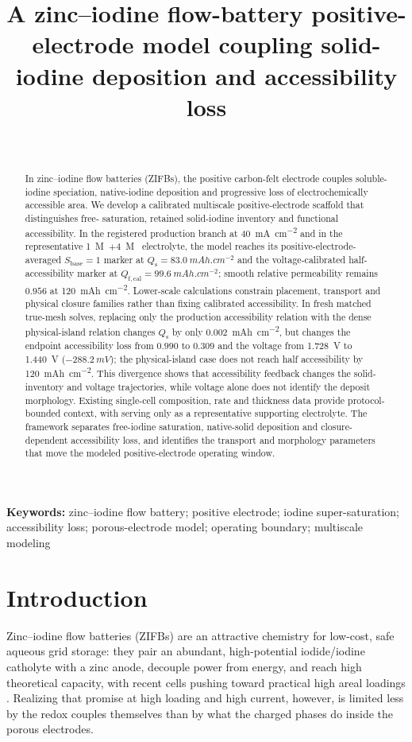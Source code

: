 \documentclass[11pt]{article}
\title{\bfseries A zinc--iodine flow-battery positive-electrode model coupling
solid-iodine deposition and accessibility loss}
\author{~}
\date{}
\newcommand{\Qfcal}{Q_{\mathrm{f,cal}}}
\begin{document}
\maketitle

\begin{abstract}
\noindent
In zinc--iodine flow batteries (ZIFBs), the positive carbon-felt electrode couples soluble-iodine
speciation, native-iodine deposition and progressive loss of electrochemically accessible area. We develop
a calibrated multiscale positive-electrode scaffold that distinguishes free- saturation, retained
solid-iodine inventory and functional accessibility. In the registered production branch at
\SI{40}{mA.cm^{-2}} and in the representative \SI{1}{M}~$+$\SI{4}{M}~
electrolyte, the model reaches its positive-electrode-averaged $S_{\mathrm{base}}=1$ marker at
$Q_{\mathrm s}=\SI{83.0}{mAh.cm^{-2}}$ and the voltage-calibrated half-accessibility marker at
$\Qfcal=\SI{99.6}{mAh.cm^{-2}}$; smooth relative permeability remains $0.956$ at
\SI{120}{mAh.cm^{-2}}. Lower-scale calculations constrain placement, transport and physical closure families
rather than fixing calibrated accessibility. In fresh matched
true-mesh solves, replacing only the production accessibility relation with the dense physical-island relation
changes $Q_{\mathrm s}$ by only \SI{0.002}{mAh.cm^{-2}}, but changes the endpoint accessibility loss from
$0.990$ to $0.309$ and the voltage from \SI{1.728}{V} to \SI{1.440}{V} ($-\SI{288.2}{mV}$); the
physical-island case does not
reach half accessibility by \SI{120}{mAh.cm^{-2}}. This divergence shows that accessibility feedback changes
the solid-inventory and voltage trajectories, while voltage alone does not identify the deposit morphology.
Existing single-cell composition, rate and thickness data provide protocol-bounded context, with 
serving only as a representative supporting electrolyte. The framework separates free-iodine saturation,
native-solid deposition and closure-dependent accessibility loss, and identifies the transport and morphology
parameters that move the modeled positive-electrode operating window.
\end{abstract}

\vspace{0.5em}\noindent\textbf{Keywords:} zinc--iodine flow battery; positive electrode; iodine
super-saturation; accessibility loss; porous-electrode model; operating boundary; multiscale
modeling

\section{Introduction}
Zinc--iodine flow batteries (ZIFBs) are an attractive chemistry for low-cost, safe aqueous grid storage: they
pair an abundant, high-potential iodide/iodine catholyte with a zinc anode, decouple power from energy, and
reach high theoretical capacity, with recent cells pushing toward practical high areal loadings
\citep{Li2015,Xie2018,Weng2017,Wen2025,Fan2024,Huang2025,WuLoading2025}. Realizing that promise at high
loading and high current, however, is limited less by the redox couples themselves than by what the charged
phases do inside the porous electrodes.
\end{document}
